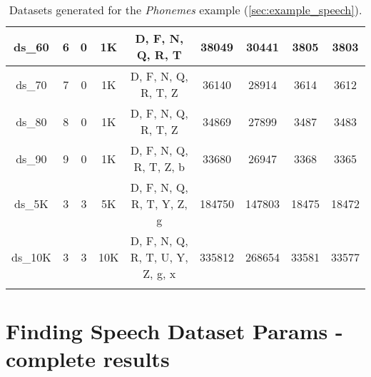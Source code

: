 \begin{footnotesize}
\begin{longtable}{|c|c|c|c|c|c|c|c|c|}
ds\_60      & 6           & 0           & 1K        & D, F, N, Q, R, T            & 38049         & 30441          & 3805           & 3803          \\ \hline
ds\_70      & 7           & 0           & 1K        & D, F, N, Q, R, T, Z         & 36140         & 28914          & 3614           & 3612          \\ \hline
ds\_80      & 8           & 0           & 1K        & D, F, N, Q, R, T, Z         & 34869         & 27899          & 3487           & 3483          \\ \hline
ds\_90      & 9           & 0           & 1K        & D, F, N, Q, R, T, Z, b      & 33680         & 26947          & 3368           & 3365          \\ \hline
ds\_5K      & 3           & 3           & 5K        & D, F, N, Q, R, T, Y, Z, g   & 184750        & 147803         & 18475          & 18472          \\ \hline
ds\_10K      & 3           & 3           & 10K      & D, F, N, Q, R, T, U, Y, Z, g, x & 335812    & 268654         & 33581          & 33577          \\ \hline
\caption{Datasets generated for the \textit{Phonemes} example (\cref{sec:example_speech}).} \label{tab:app:speech_datasets} \\
\end{longtable}
\end{footnotesize}

\section*{Finding Speech Dataset Params - complete results} \label{app:sec:finding_speech_dataset_parameters}

